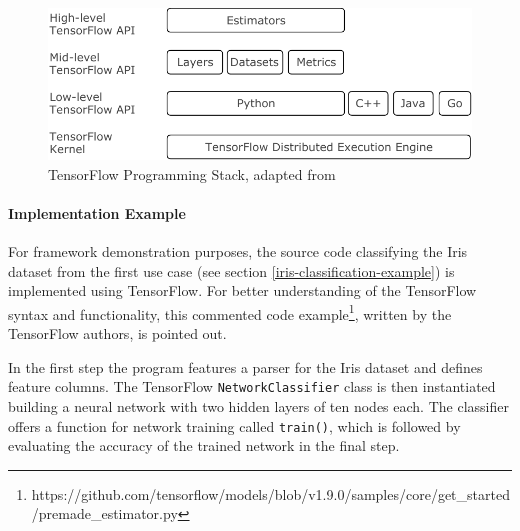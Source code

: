 \begin{figure}
\centering
\includegraphics{images/tensorflow-api-levels}
\caption{TensorFlow Programming Stack, adapted from
\cite{tensorflow-gettingstarted} \label{tensorflow-api-levels}}
\end{figure}

\paragraph{Implementation Example}\label{implementation-example}

For framework demonstration purposes, the source code classifying the
Iris dataset from the first use case (see section
\ref{iris-classification-example}) is implemented using TensorFlow. For
better understanding of the TensorFlow syntax and functionality, this
commented code example\footnote{https://github.com/tensorflow/models/blob/v1.9.0/samples/core/get\_started/premade\_estimator.py},
written by the TensorFlow authors, is pointed out.

In the first step the program features a parser for the Iris dataset and
defines feature columns. The TensorFlow \texttt{NetworkClassifier} class
is then instantiated building a neural network with two hidden layers of
ten nodes each. The classifier offers a function for network training
called \texttt{train()}, which is followed by evaluating the accuracy of
the trained network in the final step.

